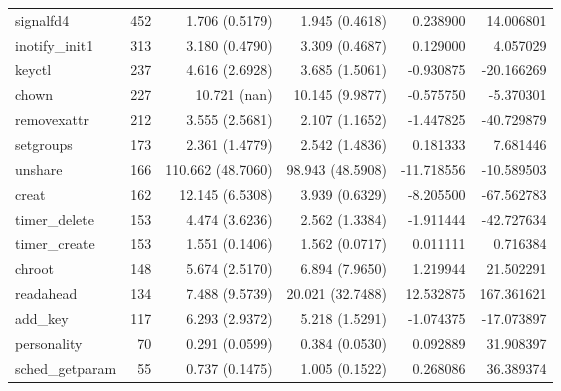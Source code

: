 \begin{longtable}{>{\ttfamily}lrrrrr}
                      signalfd4 &         452 &           1.706 (0.5179) &           1.945 (0.4618) &        0.238900 &    14.006801 \\
                 inotify\_init1 &         313 &           3.180 (0.4790) &           3.309 (0.4687) &        0.129000 &     4.057029 \\
                         keyctl &         237 &           4.616 (2.6928) &           3.685 (1.5061) &       -0.930875 &   -20.166269 \\
                          chown &         227 &             10.721 (nan) &          10.145 (9.9877) &       -0.575750 &    -5.370301 \\
                    removexattr &         212 &           3.555 (2.5681) &           2.107 (1.1652) &       -1.447825 &   -40.729879 \\
                      setgroups &         173 &           2.361 (1.4779) &           2.542 (1.4836) &        0.181333 &     7.681446 \\
                        unshare &         166 &        110.662 (48.7060) &         98.943 (48.5908) &      -11.718556 &   -10.589503 \\
                          creat &         162 &          12.145 (6.5308) &           3.939 (0.6329) &       -8.205500 &   -67.562783 \\
                  timer\_delete &         153 &           4.474 (3.6236) &           2.562 (1.3384) &       -1.911444 &   -42.727634 \\
                  timer\_create &         153 &           1.551 (0.1406) &           1.562 (0.0717) &        0.011111 &     0.716384 \\
                         chroot &         148 &           5.674 (2.5170) &           6.894 (7.9650) &        1.219944 &    21.502291 \\
                      readahead &         134 &           7.488 (9.5739) &         20.021 (32.7488) &       12.532875 &   167.361621 \\
                       add\_key &         117 &           6.293 (2.9372) &           5.218 (1.5291) &       -1.074375 &   -17.073897 \\
                    personality &          70 &           0.291 (0.0599) &           0.384 (0.0530) &        0.092889 &    31.908397 \\
                sched\_getparam &          55 &           0.737 (0.1475) &           1.005 (0.1522) &        0.268086 &    36.389374 \\

\end{longtable}
